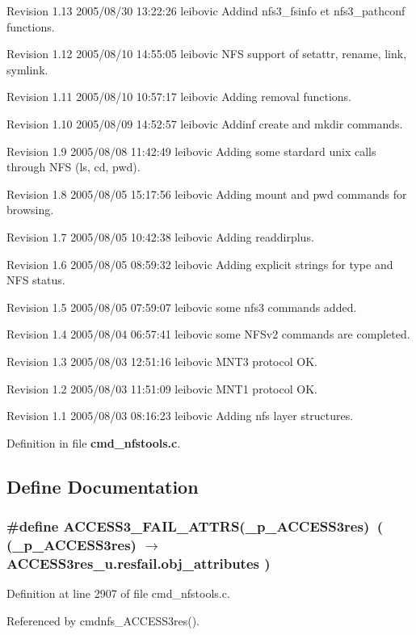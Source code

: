 Revision 1.13 2005/08/30 13:22:26 leibovic Addind nfs3\_\-fsinfo et nfs3\_\-pathconf functions.

Revision 1.12 2005/08/10 14:55:05 leibovic NFS support of setattr, rename, link, symlink.

Revision 1.11 2005/08/10 10:57:17 leibovic Adding removal functions.

Revision 1.10 2005/08/09 14:52:57 leibovic Addinf create and mkdir commands.

Revision 1.9 2005/08/08 11:42:49 leibovic Adding some stardard unix calls through NFS (ls, cd, pwd).

Revision 1.8 2005/08/05 15:17:56 leibovic Adding mount and pwd commands for browsing.

Revision 1.7 2005/08/05 10:42:38 leibovic Adding readdirplus.

Revision 1.6 2005/08/05 08:59:32 leibovic Adding explicit strings for type and NFS status.

Revision 1.5 2005/08/05 07:59:07 leibovic some nfs3 commands added.

Revision 1.4 2005/08/04 06:57:41 leibovic some NFSv2 commands are completed.

Revision 1.3 2005/08/03 12:51:16 leibovic MNT3 protocol OK.

Revision 1.2 2005/08/03 11:51:09 leibovic MNT1 protocol OK.

Revision 1.1 2005/08/03 08:16:23 leibovic Adding nfs layer structures.

Definition in file {\bf cmd\_\-nfstools.c}.

\subsection{Define Documentation}
\subsubsection{\setlength{\rightskip}{0pt plus 5cm}\#define ACCESS3\_\-FAIL\_\-ATTRS(\_\-p\_\-ACCESS3res)\ ( (\_\-p\_\-ACCESS3res) $\rightarrow$ ACCESS3res\_\-u.resfail.obj\_\-attributes )}\label{cmd__nfstools_8c_a24}




Definition at line 2907 of file cmd\_\-nfstools.c.

Referenced by cmdnfs\_\-ACCESS3res().
